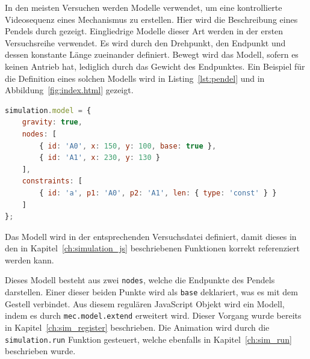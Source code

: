 In den meisten Versuchen werden  Modelle verwendet, um eine kontrollierte Videosequenz eines Mechanismus zu erstellen.
Hier wird die Beschreibung eines Pendels durch  gezeigt.
Eingliedrige Modelle dieser Art werden in der ersten Versuchsreihe verwendet.
Es wird durch den Drehpunkt, den Endpunkt und dessen konstante Länge zueinander definiert.
Bewegt wird das Modell, sofern es keinen Antrieb hat, lediglich durch das Gewicht des Endpunktes.
Ein Beispiel für die Definition eines solchen Modells wird in Listing~\ref{lst:pendel} und in Abbildung~\ref{fig:index.html} gezeigt.

\begin{lstlisting}[language=JavaScript, caption={Definition eines einfachen Pendels in \name{mec2}, inklusive animation.}, label={lst:pendel}]
simulation.model = {
    gravity: true,
    nodes: [
        { id: 'A0', x: 150, y: 100, base: true },
        { id: 'A1', x: 230, y: 130 }
    ],
    constraints: [
        { id: 'a', p1: 'A0', p2: 'A1', len: { type: 'const' } }
    ]
};
\end{lstlisting}

Das  Modell wird in der entsprechenden Versuchsdatei definiert, damit dieses in den in Kapitel~\ref{ch:simulation_js} beschriebenen Funktionen korrekt referenziert werden kann.

Dieses Modell besteht aus zwei \lstinline{nodes}, welche die Endpunkte des Pendels darstellen.
Einer dieser beiden Punkte wird als \lstinline{base} deklariert, was es mit dem Gestell verbindet.
Aus diesem regulären JavaScript Objekt wird ein  Modell, indem es durch \lstinline{mec.model.extend} erweitert wird.
Dieser Vorgang wurde bereits in Kapitel~\ref{ch:sim_register} beschrieben.
Die Animation wird durch die \lstinline{simulation.run} Funktion gesteuert, welche ebenfalls in Kapitel~\ref{ch:sim_run} beschrieben wurde.